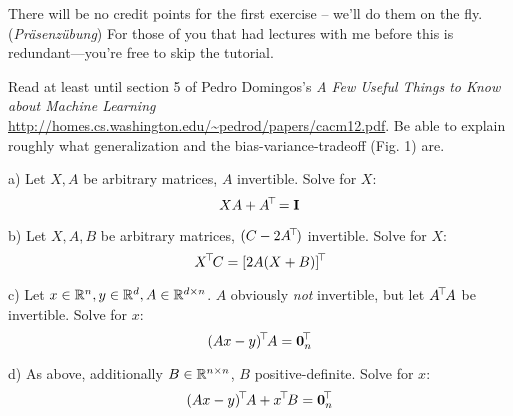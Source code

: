 

\renewcommand{\course}{Machine Learning}
\renewcommand{\exnum}{1}

\exercises

There will be no credit points for the first exercise -- we'll do them
on the fly. (\emph{Pr\"asenz\"ubung}) For those of you that had
lectures with me before this is redundant---you're free to skip the
tutorial.







Read at least until section 5 of Pedro Domingos's \emph{A Few Useful
Things to Know about Machine Learning}
{\small\url{http://homes.cs.washington.edu/~pedrod/papers/cacm12.pdf}}. 
Be able to explain roughly what generalization and the bias-variance-tradeoff
(Fig. 1) are.



a) Let $X,A$ be arbitrary matrices, $A$ invertible. Solve for $X$:
$$ X A + A^{\!\top\!} = {\rm\bf I} $$

b) Let $X,A,B$ be arbitrary matrices, $(C-2A^{\!\top\!})$ invertible. Solve for $X$:
$$ X^{\!\top\!} C = [2 A (X + B)]^{\!\top\!} $$

c) Let $x\in{\mathbb{R}}^n,y\in{\mathbb{R}}^d,A\in{\mathbb{R}}^{d\times n}$. $A$ obviously \emph{not}
invertible, but let $A^{\!\top\!} A$ be invertible. Solve for $x$:
$$ (A x - y)^{\!\top\!} A = \boldsymbol 0_n^{\!\top\!} $$

d) As above, additionally $B\in{\mathbb{R}}^{n\times n}$, $B$
positive-definite. Solve for $x$: 
$$ (A x - y)^{\!\top\!} A + x^{\!\top\!} B = \boldsymbol 0_n^{\!\top\!} $$



